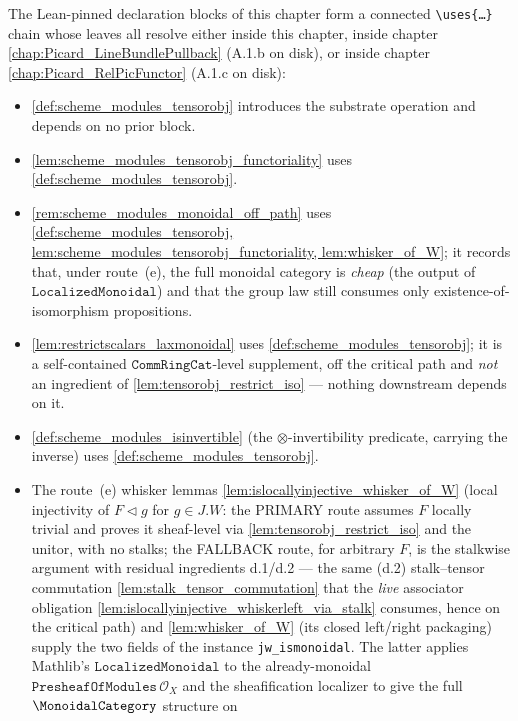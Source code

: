 The Lean-pinned declaration blocks of this chapter form a connected
\texttt{\textbackslash uses\{\dots\}} chain whose leaves all resolve
either inside this chapter, inside chapter
\cref{chap:Picard_LineBundlePullback} (A.1.b on disk), or inside
chapter \cref{chap:Picard_RelPicFunctor} (A.1.c on disk):
\begin{itemize}
  \item \cref{def:scheme_modules_tensorobj} introduces the substrate
    operation and depends on no prior block.
  \item \cref{lem:scheme_modules_tensorobj_functoriality} uses
    \cref{def:scheme_modules_tensorobj}.
  \item \cref{rem:scheme_modules_monoidal_off_path} uses
    \cref{def:scheme_modules_tensorobj,
          lem:scheme_modules_tensorobj_functoriality, lem:whisker_of_W}; it
    records that, under route~(e), the full monoidal category is \emph{cheap}
    (the output of \(\mathtt{LocalizedMonoidal}\)) and that the group law still
    consumes only existence-of-isomorphism propositions.
  \item \cref{lem:restrictscalars_laxmonoidal} uses
    \cref{def:scheme_modules_tensorobj}; it is a self-contained
    \(\mathtt{CommRingCat}\)-level supplement, off the critical path and
    \emph{not} an ingredient of \cref{lem:tensorobj_restrict_iso} --- nothing
    downstream depends on it.
  \item \cref{def:scheme_modules_isinvertible} (the \(\otimes\)-invertibility
    predicate, carrying the inverse) uses \cref{def:scheme_modules_tensorobj}.
  \item The route~(e) whisker lemmas
    \cref{lem:islocallyinjective_whisker_of_W} (local injectivity of
    \(F \triangleleft g\) for \(g \in J.W\): the PRIMARY route assumes \(F\) locally
    trivial and proves it sheaf-level via \cref{lem:tensorobj_restrict_iso} and the
    unitor, with no stalks; the FALLBACK route, for arbitrary \(F\), is the
    stalkwise argument with residual ingredients d.1/d.2 --- the same (d.2)
    stalk--tensor commutation \cref{lem:stalk_tensor_commutation} that the \emph{live}
    associator obligation \cref{lem:islocallyinjective_whiskerleft_via_stalk} consumes,
    hence on the critical path) and
    \cref{lem:whisker_of_W} (its closed left/right packaging) supply the two
    fields of the instance \texttt{jw\_ismonoidal}. The latter applies Mathlib's
    \(\mathtt{LocalizedMonoidal}\) to the already-monoidal
    \(\mathtt{PresheafOfModules}\,\mathcal{O}_X\) and the sheafification localizer
    to give the full \(\MonoidalCategory\) structure on

\end{itemize}
